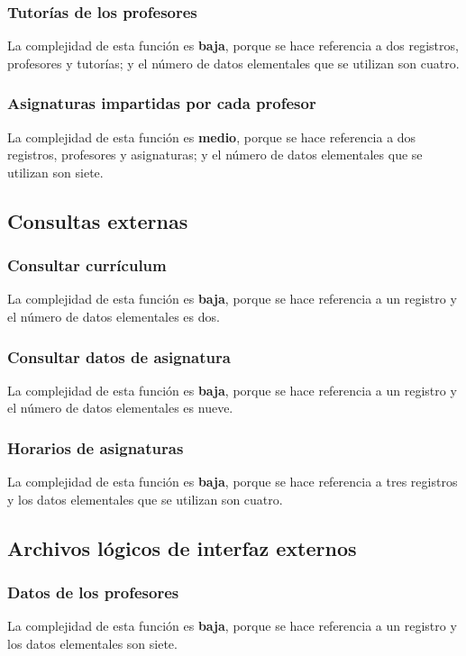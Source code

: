 \documentclass[11pt,a4paper,spanish,twoside]{book}
\begin{document}
\subsubsection{Tutorías de los profesores} 
La complejidad de esta función es \textbf{baja}, porque se hace referencia a
dos registros, profesores y tutorías; y el número de datos elementales que se
utilizan son cuatro. 

\subsubsection{Asignaturas impartidas por cada profesor}
La complejidad de esta función es \textbf{medio}, porque se hace referencia a
dos registros, profesores y asignaturas; y el número de datos elementales que
se utilizan son siete.

\subsection{Consultas externas}
\subsubsection{Consultar currículum}
La complejidad de esta función es \textbf{baja}, porque se hace referencia a
un registro y el número de datos elementales es dos.

\subsubsection{Consultar datos de asignatura} 
La complejidad de esta función es \textbf{baja}, porque se hace referencia a
un registro y el número de datos elementales es nueve.

\subsubsection{Horarios de asignaturas}
La complejidad de esta función es \textbf{baja}, porque se hace referencia a
tres registros y los datos elementales que se utilizan son cuatro.

\subsection{Archivos lógicos de interfaz externos}
\subsubsection{Datos de los profesores}
La complejidad de esta función es \textbf{baja}, porque se hace referencia a
un registro y los datos elementales son siete.
\end{document}
